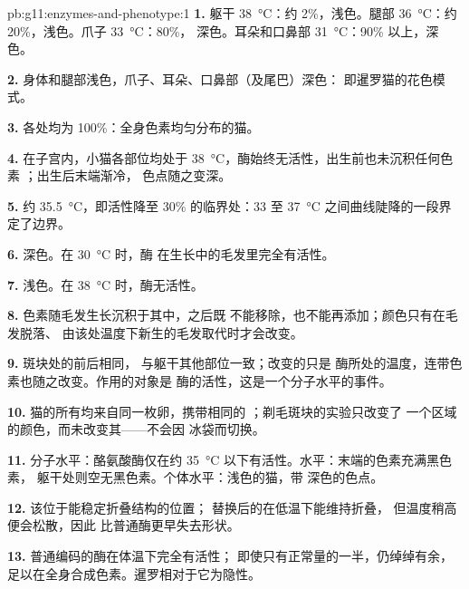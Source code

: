 \begin{solution}{pb:g11:enzymes-and-phenotype:1}
\textbf{1.} 躯干 \qty{38}{\celsius}：约 2\%，浅色。腿部 
\qty{36}{\celsius}：约 20\%，浅色。爪子 \qty{33}{\celsius}：80\%，
深色。耳朵和口鼻部 \qty{31}{\celsius}：90\% 以上，深色。

\textbf{2.} 身体和腿部浅色，爪子、耳朵、口鼻部（及尾巴）深色：
即暹罗猫的花色模式。

\textbf{3.} 各处均为 100\%：全身色素均匀分布的猫。

\textbf{4.} 在子宫内，小猫各部位均处于
\qty{38}{\celsius}，酶始终无活性，出生前也未沉积任何色素
；出生后末端渐冷，
色点随之变深。

\textbf{5.} 约 \qty{35.5}{\celsius}，即活性降至
30\% 的临界处：33 至
\qty{37}{\celsius} 之间曲线陡降的一段界定了边界。

\textbf{6.} 深色。在 \qty{30}{\celsius} 时，酶
在生长中的毛发里完全有活性。

\textbf{7.} 浅色。在 \qty{38}{\celsius} 时，酶无活性。

\textbf{8.} 色素随毛发生长沉积于其中，之后既
不能移除，也不能再添加；颜色只有在毛发脱落、
由该处温度下新生的毛发取代时才会改变。

\textbf{9.} 斑块处的前后相同，
与躯干其他部位一致；改变的只是
酶所处的温度，连带色素也随之改变。作用的对象是
酶的活性，这是一个分子水平的事件。

\textbf{10.} 猫的所有均来自同一枚卵，携带相同的
；剃毛斑块的实验只改变了
一个区域的颜色，而未改变其——不会因
冰袋而切换。

\textbf{11.} 分子水平：酪氨酸酶仅在约
\qty{35}{\celsius} 以下有活性。水平：末端的色素充满黑色素，
躯干处则空无黑色素。个体水平：浅色的猫，带
深色的色点。

\textbf{12.} 该位于能稳定折叠结构的位置；
替换后的在低温下能维持折叠，
但温度稍高便会松散，因此
比普通酶更早失去形状。

\textbf{13.} 普通编码的酶在体温下完全有活性；
即使只有正常量的一半，仍绰绰有余，
足以在全身合成色素。暹罗相对于它为隐性。


\end{solution}

